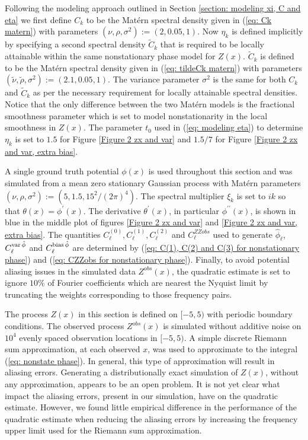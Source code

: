 \documentclass[10pt,noinfoline]{imsart}
\begin{document}
Following the modeling approach outlined in Section \ref{section: modeling xi, C and eta} we first define $C_k$ to be the  Mat\'ern spectral density given in (\ref{eq: Ck matern}) with parameters $(\nu, \rho, \sigma^2):=(2, 0.05, 1)$. Now  $\eta_k$ is defined implicitly by specifying a second spectral density $\tilde C_k$ that is required to be locally attainable within the same nonstationary phase model for $Z(x)$. $\tilde C_k$ is defined to be the  Mat\'ern spectral density given in (\ref{eq: tildeCk matern})  with parameters $(\tilde \nu, \tilde\rho, \sigma^2):=(2.1, 0.05, 1)$. The variance parameter $\sigma^2$ is the same for both $C_k$ and  $\tilde C_k$ as per the necessary requirement for locally attainable spectral densities. Notice that the only difference between the two Mat\'ern models is the fractional smoothness parameter which is set to model nonstationarity in the local smoothness in $Z(x)$.  The parameter $t_0$ used in (\ref{eq: modeling eta}) to determine $\eta_k$ is set to $1.5$ for Figure \ref{Figure 2 zx and var} and $1.5/7$ for Figure \ref{Figure 2 zx and var, extra bias}. 



A single ground truth potential $\phi(x)$ is used throughout this section and was simulated from a mean zero stationary Gaussian process with Mat\'ern parameters $(\nu, \rho, \sigma^2):=(5, 1.5, 15^2 / (2\pi)^4)$. The spectral multiplier $\xi_k$ is set to $ik$ so that $\theta(x) = \phi^\prime(x) $.  The derivative $\theta^\prime(x)$, in particular $\phi^{\prime\prime}(x)$, is shown in blue in the middle plot of figures \ref{Figure 2 zx and var} and \ref{Figure 2 zx and var, extra bias}.  
The quantities $C^{(0)}_\ell, C^{(1)}_\ell, C^{(2)}_\ell$ and $C^{ZZobs}_\ell$ used to generate  $\hat\phi_\ell$, $C^{\text{var\,}\hat\phi}_{\ell}$ and $C^{\text{bias\,}\hat\phi}_{\ell}$ are determined by (\ref{eq: C(1), C(2) and C(3) for nonstationary phase}) and (\ref{eq: CZZobs for nonstationary phase}). Finally, to avoid potential aliasing issues in the simulated data $Z^{obs}(x)$, the quadratic estimate is set to ignore $10\%$ of Fourier coefficients which are nearest the Nyquist limit by truncating the weights corresponding to those frequency pairs.



The process $Z(x)$ in this section is defined on $[-5,5)$ with periodic boundary conditions. 
The observed process $Z^{obs}(x)$ is simulated without additive noise on $10^4$ evenly spaced observation locations in $[-5,5)$.  A simple discrete Riemann sum approximation, at each observed $x$, was used to approximate to the integral (\ref{eq: nonstate phase}). In general, this type of approximation will result in aliasing errors. Generating a distributionally exact simulation of $Z(x)$, without any approximation, appears to be an open problem.   It is not yet clear what impact the aliasing errors, present in our simulation, have on the quadratic estimate. However, we found little empirical difference in the performance of the quadratic estimate when reducing the aliasing errors by increasing the frequency upper limit used for the Riemann sum approximation. 
\end{document}
